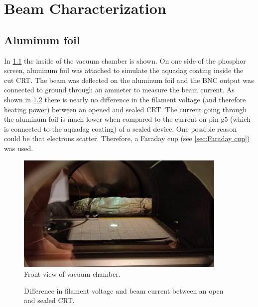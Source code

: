 
\chapter{Beam Characterization}
\label{ch:Beam Characterization}


\section{Aluminum foil}
\label{sec:Aluminum foil}

In \cref{fig:Front view of vacuum chamber} the inside of the vacuum chamber is shown. On one side of the phosphor screen, aluminum foil was attached to simulate the aquadag coating inside the cut CRT. The beam was deflected on the aluminum foil and the BNC output was connected to ground through an ammeter to measure the beam current. As shown in \cref{fig:Difference in filament voltage and beam current between an open and sealed CRT} there is nearly no difference in the filament voltage (and therefore heating power) between an opened and sealed CRT. The current going through the aluminum foil is much lower when compared to the current on pin g5 (which is connected to the aquadag coating) of a sealed device. One possible reason could be that electrons scatter. Therefore, a Faraday cup (see \cref{sec:Faraday cup}) was used.

\begin{figure}[h]
	\centering
	\includegraphics[width=0.9\textwidth]{./Chapters/beam-characterization/center_image}
	\caption{Front view of vacuum chamber.}
	\label{fig:Front view of vacuum chamber}
\end{figure}


\begin{figure}[ht]
	\centering
	
	\begin{tikzpicture}
		
	\end{tikzpicture}
	
	\caption{Difference in filament voltage and beam current between an open and sealed CRT.}
	\label{fig:Difference in filament voltage and beam current between an open and sealed CRT}
\end{figure}

